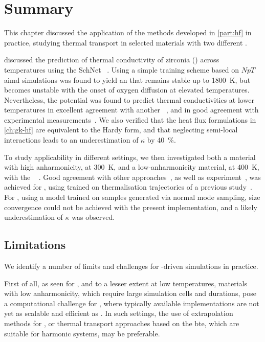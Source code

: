 
\chapter{Summary}
\label{ch:gka-end}

This chapter discussed the application of the methods developed in \cref{part:hf} in practice, studying thermal transport in selected materials with two different \glps.

 discussed the prediction of thermal conductivity of zirconia () across temperatures using the SchNet~\cite{sktm2017q,sktm2019q} \glp. Using a simple training scheme based on $NpT$ \gls{aimd} simulations was found to yield an \mlp that remains stable up to \qty{1800}{K}, but becomes unstable with the onset of oxygen diffusion at elevated temperatures. Nevertheless, the potential was found to predict thermal conductivities at lower temperatures in excellent agreement with another \mlp~\cite{vkjk2021q}, and in good agreement with experimental measurements~\cite{rwpm1998t,bflm2000t,mlld2004t}. We also verified that the heat flux formulations in \cref{ch:gk-hf} are equivalent to the Hardy form, and that neglecting semi-local interactions leads to an underestimation of $\kappa$ by \qty{40}{\percent}.

To study applicability in different settings, we then investigated both a material with high anharmonicity,  at \qty{300}{K}, and a low-anharmonicity material,  at \qty{400}{K}, with the \sok~\cite{fum2022q} \glp. Good agreement with other \gk approaches~\cite{bhke2021t,lqzg2021q,kpsc2023t}, as well as experiment~\cite{wbcr2016t}, was achieved for , using \sok \glps trained on thermalisation trajectories of a previous \aigk study~\cite{kpsc2023t}. For , using a \sok model trained on samples generated via normal mode sampling, size convergence could not be achieved with the present implementation, and a likely underestimation of $\kappa$ was observed.


\section*{Limitations}

We identify a number of limits and challenges for \glp-driven \gk simulations in practice.

First of all, as seen for , and to a lesser extent  at low temperatures, materials with low anharmonicity, which require large simulation cells and durations, pose a computational challenge for \mlps, where typically available implementations are not yet as scalable and efficient as \ffs.  In such settings, the use of extrapolation methods for \gk, or thermal transport approaches based on the \gls{bte}, which are suitable for harmonic systems, may be preferable.

